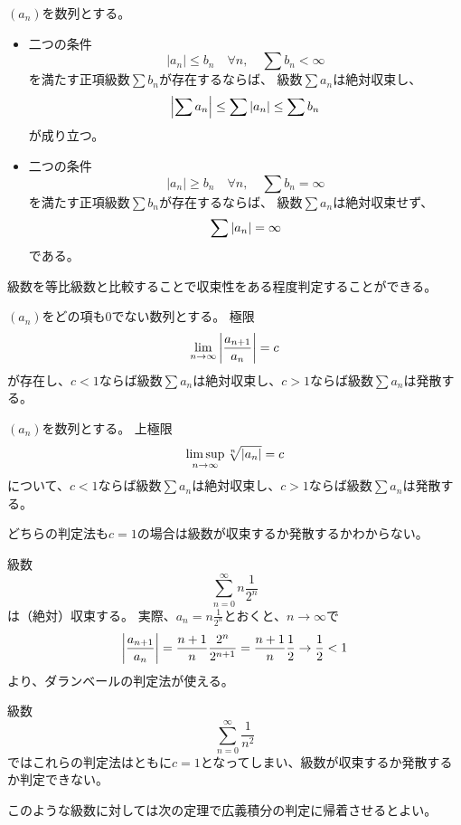 \begin{proposition}[級数の比較判定法]
$(a_n)$を数列とする。
\begin{itemize}
\item
二つの条件
$$
|a_n| \le b_n \quad \forall n,
\quad \sum b_n < \infty
$$
を満たす正項級数$\sum b_n$が存在するならば、
級数$\sum a_n$は絶対収束し、
$$
\abs{\sum a_n} \le \sum \abs{a_n} \le \sum b_n
$$
が成り立つ。
\item
二つの条件
$$
|a_n| \ge b_n \quad \forall n,
\quad \sum b_n = \infty
$$
を満たす正項級数$\sum b_n$が存在するならば、
級数$\sum a_n$は絶対収束せず、
$$
\sum \abs{a_n} = \infty
$$
である。
\end{itemize}
\end{proposition}

級数を等比級数と比較することで収束性をある程度判定することができる。

\begin{theorem}[ダランベールの判定法]
$(a_n)$をどの項も$0$でない数列とする。
極限
$$
\lim_{n \to \infty}\abs{\frac{a_{n+1}}{a_n}} = c
$$
が存在し、$c < 1$ならば級数$\sum a_n$は絶対収束し、$c > 1$ならば級数$\sum a_n$は発散する。
\end{theorem}

\begin{theorem}[コーシーの判定法]
$(a_n)$を数列とする。
上極限
$$
\limsup_{n \to \infty}\sqrt[n]{\abs{a_n}} = c
$$
について、$c < 1$ならば級数$\sum a_n$は絶対収束し、$c > 1$ならば級数$\sum a_n$は発散する。
\end{theorem}

\begin{remark}
どちらの判定法も$c = 1$の場合は級数が収束するか発散するかわからない。
\end{remark}

\begin{example}
級数
$$
\sum_{n = 0}^\infty n\frac{1}{2^n}
$$
は（絶対）収束する。
実際、$a_n = n\frac{1}{2^n}$とおくと、$n \to \infty$で
$$
\abs{\frac{a_{n+1}}{a_n}} = \frac{n+1}{n}\frac{2^n}{2^{n+1}} = \frac{n+1}{n}\frac{1}{2} \to \frac{1}{2} < 1
$$
より、ダランベールの判定法が使える。
\end{example}

\begin{example}
級数
$$
\sum_{n = 0}^\infty \frac{1}{n^2}
$$
ではこれらの判定法はともに$c = 1$となってしまい、級数が収束するか発散するか判定できない。
\end{example}

このような級数に対しては次の定理で広義積分の判定に帰着させるとよい。

